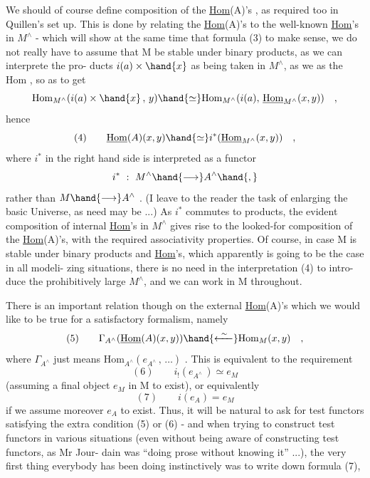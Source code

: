 We should of course define composition of the \uline{Hom}(A)'s ,  as required
too in Quillen's  set up.  This is done by relating the \uline{Hom}(A)'s  to
the well-known   \uline{Hom}'s  in $M^{\wedge}$  -  which will show at the same
time that  formula (3) to make sense,  we do not really have to assume
that M be stable under binary products,  as we can interprete the pro-%
ducts  $i(a)\times\hand{x}$  as being taken in $M^{\wedge}$,  as we as the Hom ,  so as to
get
\[ \mathrm{Hom}_{M^{\wedge}}(i(a)\times\hand{x} \, , \, y) \hand{\simeq} \mathrm{Hom}_{M^{\wedge}}(i(a), \, \underline{\mathrm{Hom}}_{M^{\wedge}}(x,y)) \quad , \]
hence
\[ (4) \qquad \underline{\mathrm{Hom}}(A)(x,y) \hand{\simeq} i^{*}(\underline{\mathrm{Hom}}_{M^{\wedge}}(x,y)) \quad , \]
where $i^{*}$  in the right hand side is interpreted as a functor
\[ i^{*} \ : \ M^{\wedge} \hand{\longrightarrow} A^{\wedge} \hand{,} \]
rather than $M \hand{\longrightarrow} A^{\wedge}$ .  (I leave to the reader the task of enlarging the
basic Universe,  as need may be ...)  As $i^{*}$ commutes to products,  the
evident composition of  internal \uline{Hom}'s  in $M^{\wedge}$ gives rise to the
looked-for composition of the \uline{Hom}(A)'s,  with the required associativity
properties.  Of course,  in case M is stable under binary products and
\uline{Hom}'s,   which apparently is going to be the case in all modeli-%
zing situations,  there is no need in the interpretation (4) to intro-%
duce the prohibitively large $M^{\wedge}$,  and we can work in M throughout.

There is an important relation though on the external \uline{Hom}(A)'s
which we would like to be true for a satisfactory formalism,  namely
\[ (5) \qquad \Gamma_{A^{\wedge}}(\underline{\mathrm{Hom}}(A)(x,y)) \hand{\xleftarrow{\ \sim\ }} \mathrm{Hom}_{M}(x,y) \quad , \]
where $\Gamma_{A^{\wedge}}$ just means  $\mathrm{Hom}_{A^{\wedge}}(e_{A^{\wedge}} \, , \, \ldots)$ .   This is equivalent  to
the requirement
\[ (6) \qquad i_{!}(e_{A^{\wedge}} \, ) \simeq e_{M} \]
(assuming a final object $e_{M}$ \xout{\unsure{)}}in M to exist),  or equivalently
\[ (7) \qquad i(e_{A}) = e_{M} \]
if we assume moreover $e_{A}$ to exist.   Thus,  it will be natural to 
ask for test functors satisfying the extra condition (5) or (6)  -
and when trying to construct test functors in various situations
(even without being aware of constructing test functors,  as Mr Jour-%
dain was ``doing prose without knowing it'' ...),  the very first thing
everybody has been doing instinctively was to write down formula (7),

